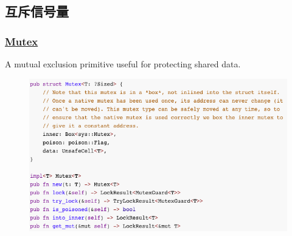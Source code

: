 \subsection{互斥信号量} %
\begin{frame}[fragile]
    \frametitle{\href{https://doc.rust-lang.org/std/sync/struct.Mutex.html}{Mutex}}

A mutual exclusion primitive useful for protecting shared data. \pause

    \begin{figure}
    \includegraphics[width=0.7\linewidth]{figs/struct-mutex.png}
    \end{figure}

\end{frame}
% 
% 
% 
% 
% 
% 
% 
% 
% 
